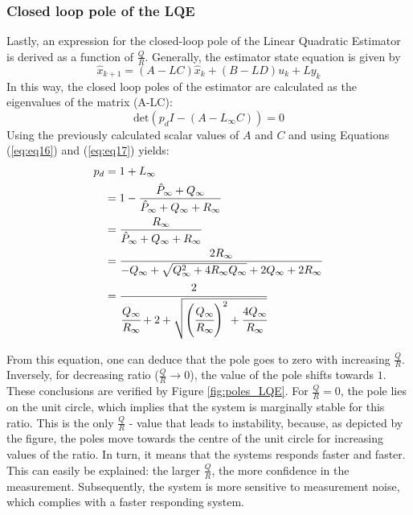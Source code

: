 \documentclass[a4paper,kul]{kulakarticle} %
\begin{document}
\subsubsection*{Closed loop pole of the LQE}
Lastly, an expression for the closed-loop pole of the Linear Quadratic Estimator is derived as a function of $\frac{Q}{R}$. Generally, the estimator state equation is given by 
\begin{equation}
	\hat{x}_{k+1} = (A-LC) \hat{x}_k + (B-LD) u_k + L y_k
\end{equation}
In this way, the closed loop poles of the estimator are calculated as the eigenvalues of the matrix (A-LC):
\begin{equation}
	\text{det}(p_d I - (A-L_\infty C)) = 0
\end{equation}
Using the previously calculated scalar values of $A$ and $C$ and using Equations (\ref{eq:eq16}) and (\ref{eq:eq17}) yields:
\begin{equation}
	\begin{split}
		p_d &= 1 + L_\infty \\
		&= 1 - \frac{\hat{P}_\infty + Q_\infty}{\hat{P}_\infty + Q_\infty + R_\infty} \\
		&= \frac{R_\infty}{\hat{P}_\infty + Q_\infty + R_\infty} \\
		&= \frac{2R_\infty}{-Q_\infty + \sqrt{Q_\infty^2 + 4R_\infty Q_\infty} + 2Q_\infty + 2R_\infty} \\
		&= \cfrac{2}{\cfrac{Q_\infty}{R_\infty} + 2 + \sqrt{\left(\cfrac{Q_\infty}{R_\infty}\right)^2 + \cfrac{4Q_\infty}{R_\infty}}}
	\end{split}
\end{equation}

\noindent From this equation, one can deduce that the pole goes to zero with increasing $\frac{Q}{R}$. Inversely, for decreasing ratio ($\frac{Q}{R} \rightarrow 0$), the value of the pole shifts towards $1$. These conclusions are verified by Figure \ref{fig:poles_LQE}. For $\frac{Q}{R} = 0$, the pole lies on the unit circle, which implies that the system is marginally stable for this ratio. This is the only $\frac{Q}{R}$ - value that leads to instability, because, as depicted by the figure, the poles move towards the centre of the unit circle for increasing values of the ratio. In turn, it means that the systems responds faster and faster. This can easily be explained: the larger $\frac{Q}{R}$, the more confidence in the measurement. Subsequently, the system is more sensitive to measurement noise, which complies with a faster responding system.
\end{document}
